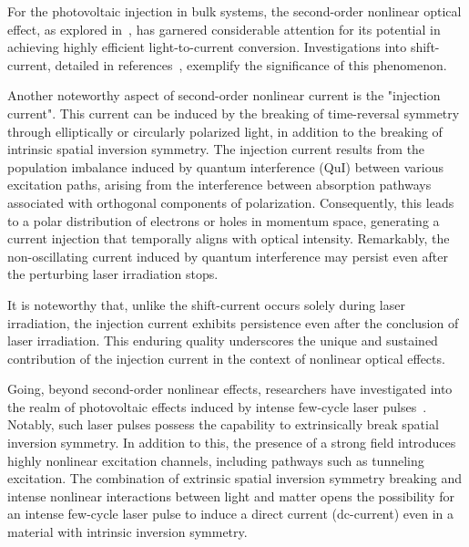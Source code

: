 For the photovoltaic injection in bulk systems, the second-order nonlinear optical effect, as explored in~\cite{PhysRevB.61.5337}, has garnered considerable attention for its potential in achieving highly efficient light-to-current conversion. Investigations into shift-current, detailed in references~\cite{PhysRevLett.107.126805,doi:10.1126/science.1168636,Yang2010,10.1063/5.0101513}, exemplify the significance of this phenomenon.

Another noteworthy aspect of second-order nonlinear current is the "injection
current"\cite{sipe2000second,laman2005ultrafast,
	10.1063/1.125084,PhysRevB.61.5337,10.1063/1.2131191}. This current can be induced by the
breaking of time-reversal symmetry through elliptically or circularly polarized light, in addition to the
breaking of intrinsic spatial inversion symmetry. The injection current results from the population
imbalance induced by quantum interference (\gls{QuI}) between various excitation paths, arising
from the interference between absorption pathways associated with orthogonal components of
polarization. Consequently, this leads to a polar distribution of electrons or holes in momentum
space, generating a current injection that temporally aligns with optical intensity. Remarkably,
the non-oscillating current induced by quantum interference may persist even after the perturbing
laser irradiation stops.

It is noteworthy that, unlike the shift-current occurs solely during laser irradiation, the injection current exhibits persistence even after the conclusion of laser irradiation. This enduring quality underscores the unique and sustained contribution of the injection current in the context of nonlinear optical effects.

Going, beyond second-order nonlinear effects, researchers have investigated into the realm of
photovoltaic effects induced by intense few-cycle laser
pulses~\cite{Schiffrin2013,PhysRevLett.113.087401,PhysRevLett.116.057401,Higuchi2017,Heide_2020,Morimoto_2022}.
Notably, such laser pulses possess the capability to extrinsically break spatial inversion
symmetry. In addition to this, the presence of a strong field introduces highly nonlinear
excitation channels, including pathways such as tunneling excitation. The combination of extrinsic spatial inversion symmetry breaking and intense nonlinear interactions between light and matter opens the possibility for an intense few-cycle laser pulse to induce a direct current (dc-current) even in a material with intrinsic inversion symmetry.


